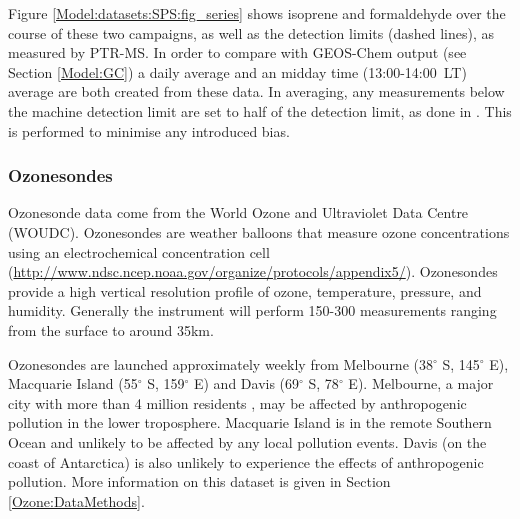       Figure \ref{Model:datasets:SPS:fig_series} shows isoprene and formaldehyde over the course of these two campaigns, as well as the detection limits (dashed lines), as measured by PTR-MS. 
      In order to compare with GEOS-Chem output (see Section \ref{Model:GC}) a daily average and an midday time (13:00-14:00~LT) average are both created from these data.
      In averaging, any measurements below the machine detection limit are set to half of the detection limit, as done in \textcite{Lawson2015}. 
      This is performed to minimise any introduced bias.
      
    
    
    
    \subsubsection{Ozonesondes}
    \label{Model:datasets:ozonesondes}
    
      Ozonesonde data come from the World Ozone and Ultraviolet Data Centre (WOUDC).
      Ozonesondes are weather balloons that measure ozone concentrations using an electrochemical concentration cell (\url{http://www.ndsc.ncep.noaa.gov/organize/protocols/appendix5/}).
      Ozonesondes provide a high vertical resolution profile of ozone, temperature, pressure, and humidity.
      Generally the instrument will perform 150-300 measurements ranging from the surface to around 35km.
      
      Ozonesondes are launched approximately weekly from Melbourne (38$^{\circ}$ S, 145$^{\circ}$ E), Macquarie Island (55$^{\circ}$ S, 159$^{\circ}$ E) and Davis (69$^{\circ}$ S, 78$^{\circ}$ E). 
      Melbourne, a major city with more than 4 million residents \parencite{ABS2016}, may be affected by anthropogenic pollution in the lower troposphere.
      Macquarie Island is in the remote Southern Ocean and unlikely to be affected by any local pollution events.
      Davis (on the coast of Antarctica) is also unlikely to experience the effects of anthropogenic pollution.
      More information on this dataset is given in Section \ref{Ozone:DataMethods}.
    
